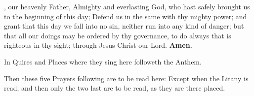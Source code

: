 , our heavenly Father, Almighty and everlasting God, who hast safely brought us to the beginning of this day; Defend us in the same with thy mighty power; and grant that this day we fall into no sin, neither run into any kind of danger; but that all our doings may be ordered by thy governance, to do always that is righteous in thy sight; through Jesus Christ our Lord.
\textbf{Amen.}

\begin{rubric}
In Quires and Places where they sing here followeth the Anthem.
\end{rubric}

\begin{rubric}
Then these five Prayers following are to be read here: Except when the Litany is read; and then only the two last are to be read, as they are there placed.
\end{rubric}





\clearpage
